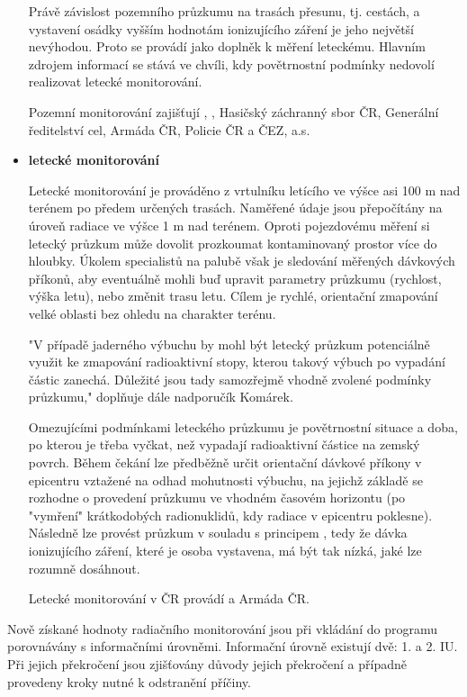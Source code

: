 \begin{itemize}
	Právě závislost pozemního průzkumu na trasách přesunu, tj. cestách, a vystavení osádky vyšším hodnotám ionizujícího záření je jeho největší nevýhodou. Proto se provádí jako doplněk k měření leteckému. Hlavním zdrojem informací se stává ve chvíli, kdy povětrnostní podmínky nedovolí realizovat letecké monitorování.
	
	Pozemní monitorování zajišťují , , Hasičský záchranný sbor ČR, Generální ředitelství cel, Armáda ČR, Policie ČR a ČEZ, a.s. 
	
	\item \textbf{letecké monitorování}
	
	Letecké monitorování je prováděno z vrtulníku letícího ve výšce asi 100 m nad terénem po předem určených trasách. Naměřené údaje jsou přepočítány na úroveň radiace ve výšce 1 m nad terénem. Oproti pojezdovému měření si letecký průzkum může dovolit prozkoumat kontaminovaný prostor více do hloubky. Úkolem specialistů na palubě však je sledování měřených dávkových příkonů, aby eventuálně mohli buď upravit parametry průzkumu (rychlost, výška letu), nebo změnit trasu letu. Cílem je rychlé, orientační zmapování velké oblasti bez ohledu na charakter terénu. 
	
	"V případě jaderného výbuchu by mohl být letecký průzkum potenciálně využit ke zmapování radioaktivní stopy, kterou takový výbuch po vypadání částic zanechá. Důležité jsou tady samozřejmě vhodně zvolené podmínky průzkumu," doplňuje dále nadporučík Komárek. 
	
	Omezujícími podmínkami leteckého průzkumu je povětrnostní situace a doba, po kterou je třeba vyčkat, než vypadají radioaktivní částice na zemský povrch. Během čekání lze předběžně určit orientační dávkové příkony v epicentru vztažené na odhad mohutnosti výbuchu, na jejichž základě se rozhodne o provedení průzkumu ve vhodném časovém horizontu (po "vymření" krátkodobých radionuklidů, kdy radiace v epicentru poklesne). Následně lze provést průzkum v souladu s principem , tedy že dávka ionizujícího záření, které je osoba vystavena, má být tak nízká, jaké lze rozumně dosáhnout.
	
	Letecké monitorování v ČR provádí  a Armáda ČR. 

\end{itemize}
	
	Nově získané hodnoty radiačního monitorování jsou při vkládání do programu  porovnávány s informačními úrovněmi. Informační úrovně existují dvě: 1. a 2. IU. Při jejich překročení jsou zjišťovány důvody jejich překročení a případně provedeny kroky nutné k odstranění příčiny.
	
